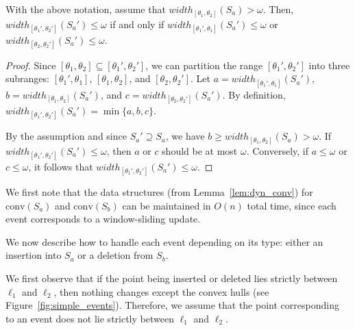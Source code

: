 \documentclass[english,a4paper, cleveref, autoref, thm-restate, nolineno]{socg-lipics-v2021}
\theoremstyle{star}
\theoremstyle{claimstar}
\newcommand{\conv}{\ensuremath{\mathrm{conv}}}
\begin{document}
\begin{lemma}
    \label{lem:width_test_obs}
    With the above notation, assume that $width_{[\theta_1, \theta_2]}(S_a) > \omega$. 
Then, \\$width_{[\theta_1', \theta_2']} (S_a') \le \omega$ if and only if 
$width_{[\theta_1' , \theta_1]}(S_a') \le \omega$ or
$width_{[\theta_2, \theta_2']}(S_a') \le \omega$.
\end{lemma}


\begin{proof}
    Since $[\theta_1, \theta_2] \subseteq [\theta_1', \theta_2']$,
    we can partition the range $[\theta_1', \theta_2']$ into three subranges: $[\theta_1', \theta_1]$, $[\theta_1, \theta_2]$, and $[\theta_2, \theta_2']$.
    Let $a = width_{[\theta_1', \theta_1]}(S_a')$, 
    $b = width_{[\theta_1, \theta_2]}(S_a')$, and 
    $c = width_{[\theta_2, \theta_2']}(S_a')$.
    By definition, $width_{[\theta_1', \theta_2']}(S_a') = \min \{a, b, c \}$. 

    By the assumption and since $S_a' \supseteq S_a$, we have $b \ge width_{[\theta_1, \theta_2]}(S_a) > \omega$.
    If $width_{[\theta_1', \theta_2']}(S_a') \allowbreak \le \omega$, then $a$ or $c$ should be at most $\omega$.
    Conversely, if $a \le \omega$ or $c \le \omega$, it follows that $width_{[\theta_1', \theta_2']}(S_a') \le \omega$.
\end{proof}






We first note that the data structures (from Lemma~\ref{lem:dyn_conv}) for $\conv(S_a)$ and $\conv(S_b)$ can be maintained in $O(n)$ total time, since each event corresponds to a window-sliding update.



We now describe how to handle each event depending on its type: either an insertion into $S_a$ or a deletion from $S_b$.

We first observe that if the point being inserted or deleted lies strictly between $\ell_1$ and $\ell_2$, then nothing changes except the convex hulls (see Figure~\ref{fig:simple_events}).
Therefore, we assume that the point corresponding to an event does not lie strictly between $\ell_1$ and $\ell_2$.
\end{document}
